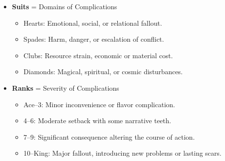 \begin{itemize}
    \item \textbf{Suits} = Domains of Complications
    \begin{itemize}
        \item Hearts: Emotional, social, or relational fallout.
        \item Spades: Harm, danger, or escalation of conflict.
        \item Clubs: Resource strain, economic or material cost.
        \item Diamonds: Magical, spiritual, or cosmic disturbances.
    \end{itemize}
    \item \textbf{Ranks} = Severity of Complications
    \begin{itemize}
        \item Ace--3: Minor inconvenience or flavor complication.
        \item 4--6: Moderate setback with some narrative teeth.
        \item 7--9: Significant consequence altering the course of action.
        \item 10--King: Major fallout, introducing new problems or lasting scars.
    \end{itemize}
\end{itemize}

